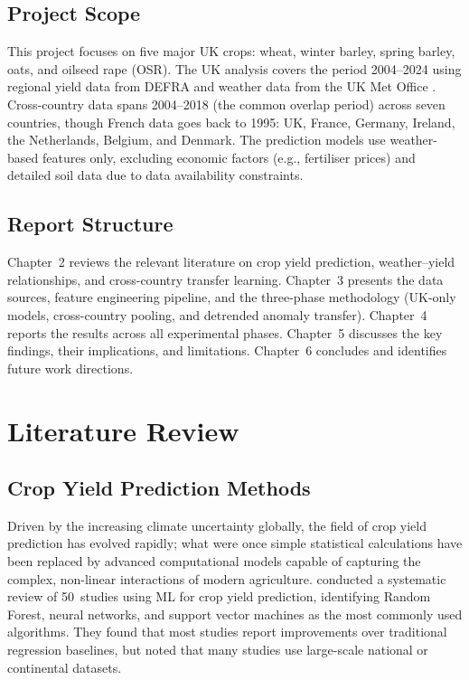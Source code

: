 \documentclass[12pt,a4paper]{report}
\begin{document}
\section{Project Scope}

This project focuses on five major UK crops: wheat, winter barley, spring barley, oats, and oilseed rape (OSR). The UK analysis covers the period 2004--2024 using regional yield data from DEFRA \citep{defra2024} and weather data from the UK Met Office \citep{metoffice2024}. Cross-country data spans 2004--2018 (the common overlap period) across seven countries, though French data goes back to 1995: UK, France, Germany, Ireland, the Netherlands, Belgium, and Denmark. The prediction models use weather-based features only, excluding economic factors (e.g., fertiliser prices) and detailed soil data due to data availability constraints.

\section{Report Structure}

Chapter~2 reviews the relevant literature on crop yield prediction, weather--yield relationships, and cross-country transfer learning. Chapter~3 presents the data sources, feature engineering pipeline, and the three-phase methodology (UK-only models, cross-country pooling, and detrended anomaly transfer). Chapter~4 reports the results across all experimental phases. Chapter~5 discusses the key findings, their implications, and limitations. Chapter~6 concludes and identifies future work directions.


\chapter{Literature Review}

\section{Crop Yield Prediction Methods}

Driven by the increasing climate uncertainty globally, the field of crop yield prediction has evolved rapidly; what were once simple statistical calculations have been replaced by advanced computational models capable of capturing the complex, non-linear interactions of modern agriculture. \citet{vanklompenburg2020} conducted a systematic review of 50~studies using ML for crop yield prediction, identifying Random Forest, neural networks, and support vector machines as the most commonly used algorithms. They found that most studies report improvements over traditional regression baselines, but noted that many studies use large-scale national or continental datasets.
\end{document}
